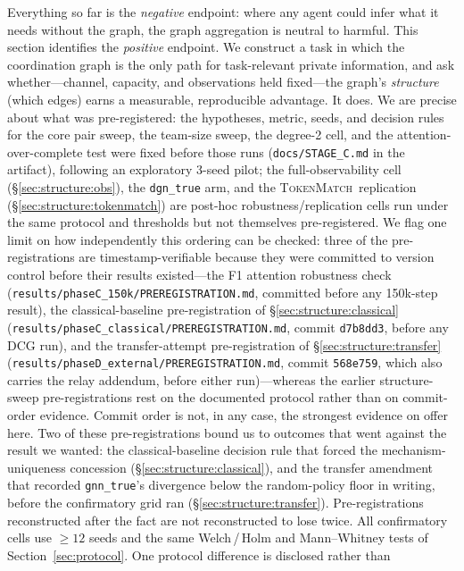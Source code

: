 \documentclass[10pt]{article}
\newcommand{\gtrue}{\texttt{gnn\_true}}
\newcommand{\tokenmatch}{\textsc{TokenMatch}}
\begin{document}
Everything so far is the \emph{negative} endpoint: where any agent could
infer what it needs without the graph, the graph aggregation is neutral to
harmful. This section identifies the \emph{positive} endpoint. We construct a
task in which the coordination graph is the only path for task-relevant
private information, and ask whether---channel, capacity, and observations
held fixed---the graph's \emph{structure} (which edges) earns a measurable,
reproducible advantage. It does. We are precise about what was
pre-registered: the hypotheses, metric, seeds, and decision rules for the
core pair sweep, the team-size sweep, the degree-2 cell, and the
attention-over-complete test were fixed before those runs
(\texttt{docs/STAGE\_C.md} in the artifact), following an exploratory
3-seed pilot; the full-observability cell
(\S\ref{sec:structure:obs}), the \texttt{dgn\_true} arm, and the
\tokenmatch\ replication (\S\ref{sec:structure:tokenmatch}) are post-hoc
robustness/replication cells run under the same protocol and thresholds but
not themselves pre-registered. We flag one limit on how independently this
ordering can be checked: three of the pre-registrations are timestamp-verifiable
because they were committed to version control before their results existed---the
F1 attention robustness check
(\texttt{results/phaseC\_150k/PREREGISTRATION.md}, committed before any 150k-step
result), the classical-baseline pre-registration of
\S\ref{sec:structure:classical}
(\texttt{results/phaseC\_classical/PREREGISTRATION.md}, commit \texttt{d7b8dd3},
before any DCG run), and the transfer-attempt pre-registration of
\S\ref{sec:structure:transfer}
(\texttt{results/phaseD\_external/PREREGISTRATION.md}, commit \texttt{568e759},
which also carries the relay addendum, before either
run)---whereas the earlier structure-sweep pre-registrations rest
on the documented protocol rather than on commit-order evidence.
Commit order is not, in any case, the strongest evidence on offer here. Two of
these pre-registrations bound us to outcomes that went against the result we
wanted: the classical-baseline decision rule that forced the
mechanism-uniqueness concession (\S\ref{sec:structure:classical}), and the
transfer amendment that recorded \gtrue's divergence below the random-policy
floor in writing, before the confirmatory grid ran
(\S\ref{sec:structure:transfer}). Pre-registrations reconstructed after the
fact are not reconstructed to lose twice. All confirmatory cells use $\ge 12$ seeds and
the same Welch\,/\,Holm and Mann--Whitney tests of
Section~\ref{sec:protocol}. One protocol difference is disclosed rather than
\end{document}
